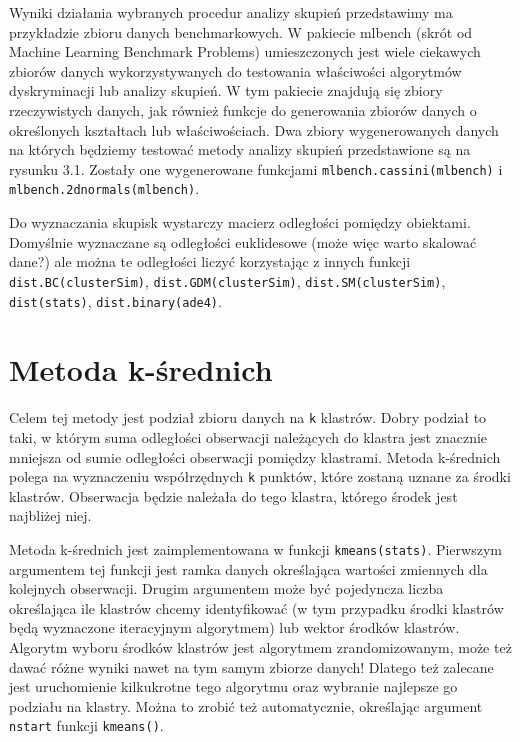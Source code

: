 \documentclass[polish,]{book}
\begin{document}
Wyniki działania wybranych procedur analizy skupień przedstawimy ma przykładzie zbioru danych benchmarkowych. W pakiecie mlbench (skrót od Machine
Learning Benchmark Problems) umieszczonych jest wiele ciekawych zbiorów danych
wykorzystywanych do testowania właściwości algorytmów dyskryminacji lub analizy skupień. W tym pakiecie znajdują się zbiory rzeczywistych danych, jak również
funkcje do generowania zbiorów danych o określonych kształtach lub właściwościach.
Dwa zbiory wygenerowanych danych na których będziemy testować metody analizy skupień przedstawione są na rysunku 3.1. Zostały one wygenerowane funkcjami
\texttt{mlbench.cassini(mlbench)} i \texttt{mlbench.2dnormals(mlbench)}.

Do wyznaczania skupisk wystarczy macierz odległości pomiędzy obiektami. Domyślnie wyznaczane są odległości euklidesowe (może więc warto skalować dane?)
ale można te odległości liczyć korzystając z innych funkcji \texttt{dist.BC(clusterSim)},
\texttt{dist.GDM(clusterSim)}, \texttt{dist.SM(clusterSim)}, \texttt{dist(stats)}, \texttt{dist.binary(ade4)}.

\hypertarget{part_31}{%
\section{Metoda k-średnich}\label{part_31}}

Celem tej metody jest podział zbioru danych na \texttt{k} klastrów. Dobry podział to taki,
w którym suma odległości obserwacji należących do klastra jest znacznie mniejsza
od sumie odległości obserwacji pomiędzy klastrami. Metoda k-średnich polega na
wyznaczeniu współrzędnych \texttt{k} punktów, które zostaną uznane za środki klastrów.
Obserwacja będzie należała do tego klastra, którego środek jest najbliżej niej.

Metoda k-średnich jest zaimplementowana w funkcji \texttt{kmeans(stats)}. Pierwszym
argumentem tej funkcji jest ramka danych określająca wartości zmiennych dla kolejnych obserwacji. Drugim argumentem może być pojedyncza liczba określająca ile
klastrów chcemy identyfikować (w tym przypadku środki klastrów będą wyznaczone
iteracyjnym algorytmem) lub wektor środków klastrów. Algorytm wyboru środków
klastrów jest algorytmem zrandomizowanym, może też dawać różne wyniki nawet
na tym samym zbiorze danych! Dlatego też zalecane jest uruchomienie kilkukrotne
tego algorytmu oraz wybranie najlepsze go podziału na klastry. Można to zrobić też
automatycznie, określając argument \texttt{nstart} funkcji \texttt{kmeans()}.
\end{document}
